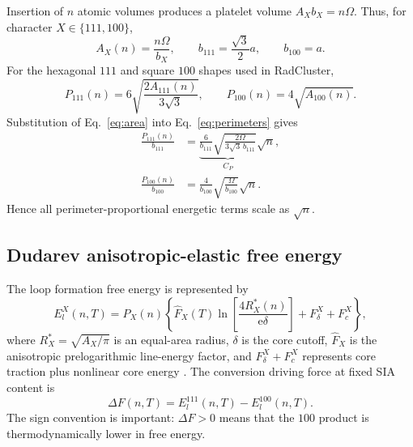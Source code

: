 \documentclass[11pt,a4paper]{article}
\newcommand{\e}{\mathrm e}
\newcommand{\rc}{\textsf{RadCluster}}
\begin{document}
Insertion of $n$ atomic volumes produces a platelet volume $A_Xb_X=n\Omega$.
Thus, for character $X\in\{111,100\}$,
\begin{equation}
 A_X(n)=\frac{n\Omega}{b_X},\qquad
 b_{111}=\frac{\sqrt3}{2}a,\qquad b_{100}=a.                           \label{eq:area}
\end{equation}
For the hexagonal $111$ and square $100$ shapes used in \rc,
\begin{equation}
 P_{111}(n)=6\sqrt{\frac{2A_{111}(n)}{3\sqrt3}},\qquad
 P_{100}(n)=4\sqrt{A_{100}(n)}.                                      \label{eq:perimeters}
\end{equation}
Substitution of Eq.~\eqref{eq:area} into Eq.~\eqref{eq:perimeters} gives
\begin{align}
 \frac{P_{111}(n)}{b_{111}}
 &=\underbrace{\frac{6}{b_{111}}
 \sqrt{\frac{2\Omega}{3\sqrt3\,b_{111}}}}_{C_P}\sqrt n,
                                                               \label{eq:Cp}\\
 \frac{P_{100}(n)}{b_{100}}
 &=\frac{4}{b_{100}}\sqrt{\frac{\Omega}{b_{100}}}\sqrt n.     \label{eq:P100scale}
\end{align}
Hence all perimeter-proportional energetic terms scale as $\sqrt n$.

\subsection{Dudarev anisotropic-elastic free energy}

The loop formation free energy is represented by
\begin{equation}
 E_l^X(n,T)=P_X(n)\left\{
 \widehat F_X(T)\ln\!\left[\frac{4R_X^*(n)}{\e\delta}\right]
 +F_\delta^X+F_c^X\right\},                                         \label{eq:loopF}
\end{equation}
where $R_X^*=\sqrt{A_X/\pi}$ is an equal-area radius, $\delta$ is the core
cutoff, $\widehat F_X$ is the anisotropic prelogarithmic line-energy factor,
and $F_\delta^X+F_c^X$ represents core traction plus nonlinear core energy
\citep{DudarevBullough2008}.  The conversion driving force at fixed SIA content
is
\begin{equation}
 \Delta F(n,T)=E_l^{111}(n,T)-E_l^{100}(n,T).                          \label{eq:dF}
\end{equation}
The sign convention is important: $\Delta F>0$ means that the $100$ product is
thermodynamically lower in free energy.
\end{document}
